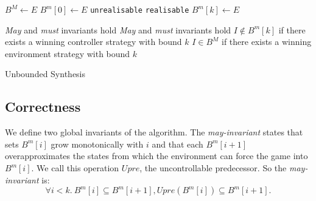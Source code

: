 \documentclass{llncs}
\begin{document}
\begin{algorithm}[h]
    \begin{algorithmic}[1]
            \State $B^M \gets E$
            \State $B^m[0] \gets E$
                    \Return \texttt{unrealisable} 
                \EndIIf
                 
                    \State \hspace{\algorithmicindent} \Return \texttt{realisable} 
                \EndIIf
                \State $B^m[k] \gets E$
                \State {}
            \EndFor
        \EndFunction
    \end{algorithmic}

    \begin{algorithmic}
        \Require \emph{May} and \emph{must} invariants hold
        \Ensure \emph{May} and \emph{must} invariants hold
        \Ensure $I \not\in B^m[k]$ if there exists a winning controller strategy with bound $k$
        \Ensure $I \in B^M$ if there exists a winning environment strategy with bound $k$
            \State \Return {}
        \EndFunction
    \end{algorithmic}
    \caption{Unbounded Synthesis}
    \label{alg:unbounded}
\end{algorithm}



\subsection{Correctness}


We define two global invariants of the algorithm.  The \emph{may-invariant}
states that sets $B^m[i]$ grow monotonically with $i$ and that each $B^m[i+1]$
overapproximates the states from which the environment can force the game into
$B^m[i]$. We call this operation $Upre$, the uncontrollable predecessor. So the
\emph{may-invariant} is: $$\forall i<k.~B^m[i] \subseteq B^m[i+1], Upre(B^m[i])
\subseteq B^m[i+1].$$
\end{document}

